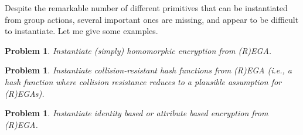 \documentclass{article}
\newtheorem{prob}[ex]{Problem}
\begin{document}
Despite the remarkable number of different primitives that can be
instantiated from group actions, several important ones are missing,
and appear to be difficult to instantiate.  Let me give some examples.

\begin{prob}
  Instantiate \emph{(simply) homomorphic encryption} from (R)EGA.
\end{prob}

\begin{prob}
  Instantiate \emph{collision-resistant hash functions} from (R)EGA
  (i.e., a hash function where collision resistance reduces to a
  plausible assumption for (R)EGAs).
\end{prob}

\begin{prob}
  Instantiate \emph{identity based} or \emph{attribute based
    encryption} from (R)EGA.
\end{prob}




\end{document}
